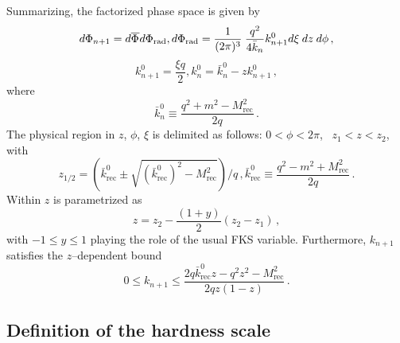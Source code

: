\documentclass[11pt,a4paper]{article}
\newcommand{\tmop}[1]{\ensuremath{\operatorname{#1}}}
\newcommand{\tmtexttt}[1]{{\ttfamily{#1}}}
\begin{document}
Summarizing, the factorized phase space is given by
\begin{equation}
  d \Phi_{n + 1} = d \overline{\Phi_{}} d \Phi_{\tmop{rad}}, d
  \Phi_{\tmop{rad}} = \frac{1}{(2 \pi)^3} \hspace{0.25em} \frac{q^2}{4
  \bar{k}_n} k_{n + 1}^0 d \xi \hspace{0.25em} dz \hspace{0.25em} d \phi \, ,
\end{equation}
\begin{equation}
  k^0_{n + 1} = \frac{\xi q}{2}, k^0_n = \bar{k}^0_n - zk^0_{n + 1} \, ,
  \label{eq:zandcsi}
\end{equation}
where
\begin{equation}
  \bar{k}_n^0 \equiv \frac{q^2 + m^2 - M_{\tmop{rec}}^2}{2 q} \, .
\end{equation}
The physical region in $z$, $\phi$, $\xi$ is delimited as follows: $0 < \phi <
2 \pi$, \ $z_1 < z < z_2$, with
\begin{equation}
  z_{1 / 2} = \left( \bar{k}^0_{\tmop{rec}} \pm \sqrt{(
  \bar{k}^0_{\tmop{rec}})^2 - M_{\tmop{rec}}^2} \right) / q \, ,
  \bar{k}^0_{\tmop{rec}} \equiv \frac{q^2 - m^2 + M_{\tmop{rec}}^2}{2 q} \, .
  \label{eq:z12kbrec}
\end{equation}
Within \tmtexttt{POWHEG} $z$ is parametrized as
\begin{equation}
  z = z_2 - \frac{(1 + y)}{2} (z_2 - z_1) \, ,
\end{equation}
with $- 1 \leqslant y \leqslant 1$ playing the role of the usual FKS variable.
Furthermore, $k_{n + 1}$ satisfies the $z$--dependent bound
\begin{equation}
  0 \leqslant k_{n + 1} \leqslant \frac{2 q \bar{k}^0_{\tmop{rec}} z - q^2 z^2
  - M_{\tmop{rec}}^2}{2 qz (1 - z)} \, .
\end{equation}

\subsection{Definition of the hardness scale}
\end{document}
